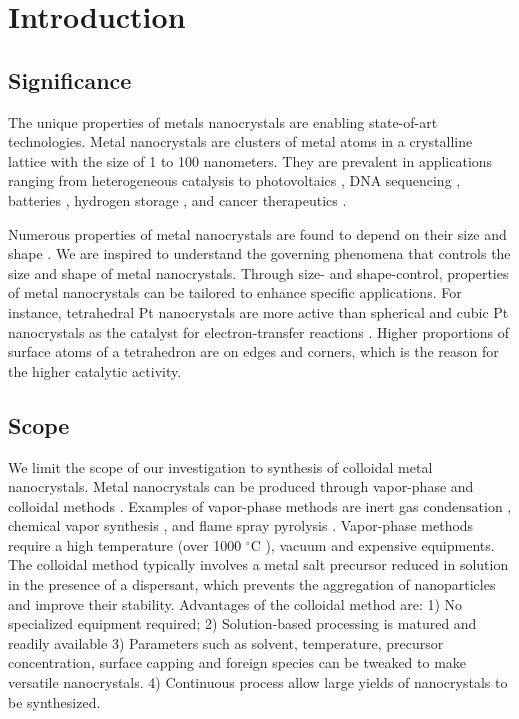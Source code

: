 \section{Introduction}

\subsection{Significance}

The unique properties of metals nanocrystals are enabling state-of-art technologies.
Metal nanocrystals are clusters of metal atoms in a crystalline lattice with the size of 1 to 100 nanometers.
They are prevalent in applications ranging from heterogeneous catalysis \cite{astruc2008nanoparticles,Astruc_2006} to photovoltaics \cite{Atwater_2010}, DNA sequencing \cite{McNally_2010}, batteries \cite{Panniello_2014}, hydrogen storage \cite{Jena_2011,Ramos_Castillo_2015}, and cancer therapeutics \cite{Jain_2010,Kim_2010}.

Numerous properties of metal nanocrystals are found to depend on their size \cite{Roduner_2006} and shape \cite{Xia_2008}.
We are inspired to understand the governing phenomena that controls the size and shape of metal nanocrystals.
Through size- and shape-control, properties of metal nanocrystals can be tailored to enhance specific applications.
For instance, tetrahedral Pt nanocrystals are more active than spherical and cubic Pt nanocrystals as the catalyst for electron-transfer reactions \cite{Narayanan_2005}.
Higher proportions of surface atoms of a tetrahedron are on edges and corners, which is the reason for the higher catalytic activity.

\subsection{Scope}

We limit the scope of our investigation to synthesis of colloidal metal nanocrystals.
Metal nanocrystals can be produced through vapor-phase \cite{Swihart_2003} and colloidal methods \cite{Tao_2008}. Examples of vapor-phase methods are inert gas condensation \cite{Wegner_2002,Simchi_2007}, chemical vapor synthesis \cite{Lee_2012,Ostraat_2001}, and flame spray pyrolysis \cite{Teoh_2010}. 
Vapor-phase methods require a high temperature (over 1000 $^{\circ}$C \cite{Smetana_2005}), vacuum and expensive equipments.
The colloidal method typically involves a metal salt precursor reduced in solution in the presence of a dispersant, which prevents the aggregation of nanoparticles and improve their stability.
Advantages of the colloidal method are: 
1) No specialized equipment required; 
2) Solution-based processing is matured and readily available
3) Parameters such as solvent, temperature, precursor concentration, surface capping and foreign species can be tweaked to make versatile nanocrystals.
4) Continuous process allow large yields of nanocrystals to be synthesized.

